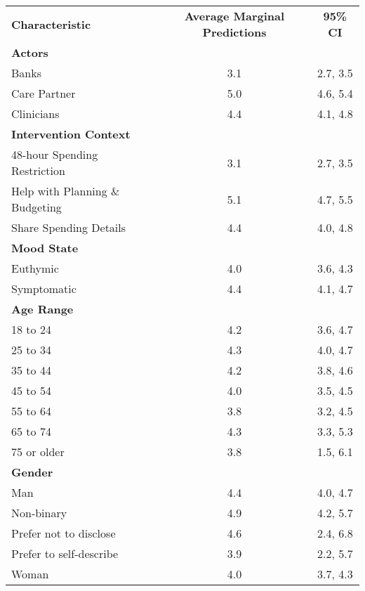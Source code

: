 \begin{longtable}{lcc}
\hline
\textbf{Characteristic} & \textbf{Average Marginal Predictions} & \textbf{95\% CI}\\

\textbf{Actors} &  & \\
\hspace{1em}Banks & 3.1 & 2.7, 3.5\\
\hspace{1em}Care Partner & 5.0 & 4.6, 5.4\\
\hspace{1em}Clinicians & 4.4 & 4.1, 4.8\\

\textbf{Intervention Context} &  & \\
\hspace{1em}48-hour Spending Restriction & 3.1 & 2.7, 3.5\\
\hspace{1em}Help with Planning \& Budgeting & 5.1 & 4.7, 5.5\\
\hspace{1em}Share Spending Details & 4.4 & 4.0, 4.8\\

\textbf{Mood State} &  & \\
\hspace{1em}Euthymic & 4.0 & 3.6, 4.3\\
\hspace{1em}Symptomatic & 4.4 & 4.1, 4.7\\

\textbf{Age Range} &  & \\
\hspace{1em}18 to 24 & 4.2 & 3.6, 4.7\\
\hspace{1em}25 to 34 & 4.3 & 4.0, 4.7\\
\hspace{1em}35 to 44 & 4.2 & 3.8, 4.6\\
\hspace{1em}45 to 54 & 4.0 & 3.5, 4.5\\
\hspace{1em}55 to 64 & 3.8 & 3.2, 4.5\\
\hspace{1em}65 to 74 & 4.3 & 3.3, 5.3\\
\hspace{1em}75 or older & 3.8 & 1.5, 6.1\\

\textbf{Gender} &  & \\
\hspace{1em}Man & 4.4 & 4.0, 4.7\\
\hspace{1em}Non-binary & 4.9 & 4.2, 5.7\\
\hspace{1em}Prefer not to disclose & 4.6 & 2.4, 6.8\\
\hspace{1em}Prefer to self-describe & 3.9 & 2.2, 5.7\\
\hspace{1em}Woman & 4.0 & 3.7, 4.3\\


\end{longtable}
